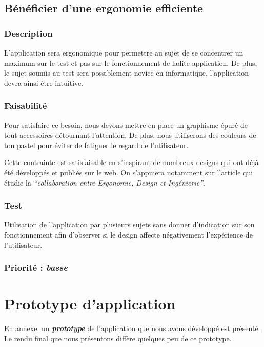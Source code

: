 \subsection{Bénéficier d’une ergonomie efficiente}

\subsubsection{Description}

L’application sera ergonomique pour permettre au sujet de se concentrer un maximum sur le test et pas sur le fonctionnement de ladite application. De plus, le sujet soumis au test sera possiblement novice en informatique, l’application devra ainsi être intuitive.

\subsubsection{Faisabilité}

Pour satisfaire ce besoin, nous devons mettre en place un graphisme épuré de tout accessoires détournant l’attention. De plus, nous utiliserons des couleurs de ton pastel pour éviter de fatiguer le regard de l’utilisateur.

Cette contrainte est satisfaisable en s’inspirant de nombreux designs qui ont déjà été développés et publiés sur le web. On s’appuiera notamment sur l’article \cite{lente2014scenariser} qui étudie la \textit{“collaboration entre Ergonomie, Design et Ingénierie”}.

\subsubsection{Test}

Utilisation de l’application par plusieurs sujets sans donner d’indication sur son fonctionnement afin d’observer si le design affecte négativement l'expérience de l’utilisateur.

\subsubsection{Priorité : \textit{basse}}

\section{Prototype d'application}

 En annexe, un \textbf{\textit{prototype}} de l'application que nous avons développé est présenté. Le rendu final que nous présentons diffère quelques peu de ce prototype.

